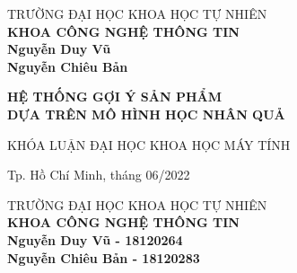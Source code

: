 \begin{titlepage}

\begin{center}
TRƯỜNG ĐẠI HỌC KHOA HỌC TỰ NHIÊN\\
\textbf{KHOA CÔNG NGHỆ THÔNG TIN}\\[2cm]


{ \Large \bfseries Nguyễn Duy Vũ\\} 
{ \Large \bfseries Nguyễn Chiêu Bản\\[2cm] } 


{ \Large \bfseries HỆ THỐNG GỢI Ý SẢN PHẨM \\ DỰA TRÊN MÔ HÌNH HỌC NHÂN QUẢ \\[3cm]} 


\large KHÓA LUẬN ĐẠI HỌC KHOA HỌC MÁY TÍNH\\



\vfill
Tp. Hồ Chí Minh, tháng 06/2022

\end{center}

\pagebreak



\begin{center}

TRƯỜNG ĐẠI HỌC KHOA HỌC TỰ NHIÊN\\
\textbf{KHOA CÔNG NGHỆ THÔNG TIN}\\[2cm]


{\large \bfseries Nguyễn Duy Vũ - 18120264\\} 
{\large \bfseries Nguyễn Chiêu Bản - 18120283\\[2cm]} 



\end{center}
\end{titlepage}
